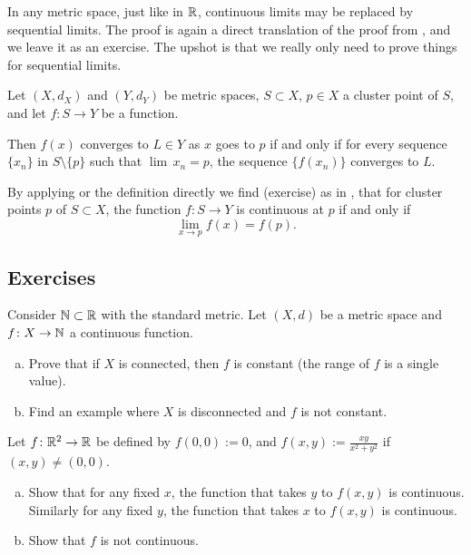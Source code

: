 In any metric space, just like in ${\mathbb{R}}$, continuous limits may be
replaced by sequential limits.  The proof is again a direct translation
of the proof from , and we leave it as an
exercise.  The upshot is that we really only need to prove things for
sequential limits.

\begin{lemma}\label{ms:seqflimit:lemma}
Let $(X,d_X)$ and $(Y,d_Y)$ be metric spaces, $S \subset X$, $p \in X$
a cluster point of $S$, and let $f \colon S \to Y$ be a function.

Then
$f(x)$ converges to $L \in Y$ as $x$ goes to $p$ if and only if for every sequence $\{ x_n \}$
in $S \setminus \{p\}$
such that $\lim\, x_n = p$,
the sequence $\{ f(x_n) \}$ converges to $L$.
\end{lemma}

By applying  or the definition directly we find
(exercise) as in , that for cluster points $p$ of $S
\subset X$, the function
$f \colon S \to Y$ is continuous at $p$ if and only if
\begin{equation*}
\lim_{x \to p} f(x) = f(p) .
\end{equation*}

\subsection{Exercises}

\begin{exercise}
Consider ${\mathbb{N}} \subset {\mathbb{R}}$ with the standard metric.  Let $(X,d)$ be a
metric space and $f \colon X \to {\mathbb{N}}$ a continuous function.
\begin{enumerate}[a)]
\item
Prove that if $X$ is connected,
then $f$ is constant (the range of $f$ is a single value).
\item
Find an example where $X$ is disconnected and $f$ is not constant.
\end{enumerate}
\end{exercise}

\begin{exercise} \label{exercise:dicontR2}
Let $f \colon {\mathbb{R}}^2 \to {\mathbb{R}}$ be defined by $f(0,0) := 0$, and
$f(x,y) := \frac{xy}{x^2+y^2}$ if $(x,y) \not= (0,0)$.
\begin{enumerate}[a)]
\item
Show that for any fixed $x$,
the function that takes $y$ to $f(x,y)$ is continuous.  Similarly
for any fixed $y$, the function that takes $x$ to $f(x,y)$ is continuous.
\item
Show that $f$ is not continuous.
\end{enumerate}
\end{exercise}

